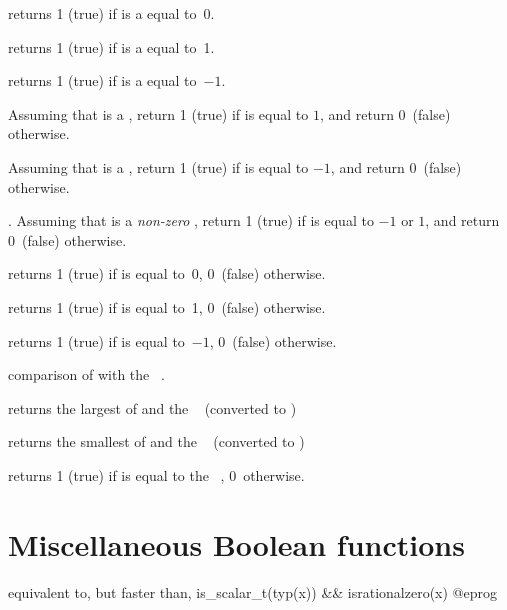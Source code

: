  returns 1 (true) if  is a 
equal to~0.

 returns 1 (true) if  is a 
equal to~1.

 returns 1 (true) if  is a 
equal to~$-1$.

Assuming that  is a , return 1 (true) if  is equal to
$1$, and return 0~(false) otherwise.

Assuming that  is a , return 1 (true) if  is equal to
$-1$, and return 0~(false) otherwise.

. Assuming that  is a
\emph{non-zero} , return 1 (true) if  is equal to $-1$ or
$1$, and return 0~(false) otherwise.

 returns 1 (true) if  is equal to~0, 0~(false)
otherwise.

 returns 1 (true) if  is equal to~1, 0~(false)
otherwise.

 returns 1 (true) if  is equal to~$-1$,
0~(false) otherwise.



 comparison of  with the
~.


 returns the largest of  and
the ~ (converted to )


 returns the smallest of  and the
~ (converted to )


 returns 1 (true) if  is equal to
the ~, 0~otherwise.

\section{Miscellaneous Boolean functions}

 equivalent to, but faster than,
\bprog
  is_scalar_t(typ(x)) && isrationalzero(x)
@eprog

